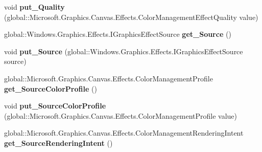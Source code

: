 \begin{DoxyCompactItemize}
void {\bfseries put\+\_\+\+Quality} (global\+::\+Microsoft.\+Graphics.\+Canvas.\+Effects.\+Color\+Management\+Effect\+Quality value)
\item 
\mbox{\label{interface_microsoft_1_1_graphics_1_1_canvas_1_1_effects_1_1_i_color_management_effect_a836413a00b466fca673e824579e980b1}} 
global\+::\+Windows.\+Graphics.\+Effects.\+I\+Graphics\+Effect\+Source {\bfseries get\+\_\+\+Source} ()
\item 
\mbox{\label{interface_microsoft_1_1_graphics_1_1_canvas_1_1_effects_1_1_i_color_management_effect_a606468f964e7f248f59152b490d12d58}} 
void {\bfseries put\+\_\+\+Source} (global\+::\+Windows.\+Graphics.\+Effects.\+I\+Graphics\+Effect\+Source source)
\item 
\mbox{\label{interface_microsoft_1_1_graphics_1_1_canvas_1_1_effects_1_1_i_color_management_effect_ab5d6882071f30c0d22c6206687b4b83b}} 
global\+::\+Microsoft.\+Graphics.\+Canvas.\+Effects.\+Color\+Management\+Profile {\bfseries get\+\_\+\+Source\+Color\+Profile} ()
\item 
\mbox{\label{interface_microsoft_1_1_graphics_1_1_canvas_1_1_effects_1_1_i_color_management_effect_aa757b92037b6dabd9bf623a16c5dd4e6}} 
void {\bfseries put\+\_\+\+Source\+Color\+Profile} (global\+::\+Microsoft.\+Graphics.\+Canvas.\+Effects.\+Color\+Management\+Profile value)
\item 
\mbox{\label{interface_microsoft_1_1_graphics_1_1_canvas_1_1_effects_1_1_i_color_management_effect_aa7388e8ab03296386d33f1faf0617131}} 
global\+::\+Microsoft.\+Graphics.\+Canvas.\+Effects.\+Color\+Management\+Rendering\+Intent {\bfseries get\+\_\+\+Source\+Rendering\+Intent} ()
\item 
\mbox{\label{interface_microsoft_1_1_graphics_1_1_canvas_1_1_effects_1_1_i_color_management_effect_aa7e9dbcbb6bca52b58c9c59dea51a272}} 

\end{DoxyCompactItemize}
